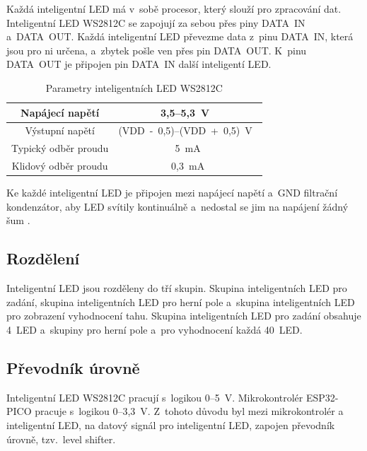   Každá inteligentní LED má v~sobě procesor, který slouží pro zpracování dat. 
  Inteligentní LED WS2812C se zapojují za sebou přes piny DATA~IN a~DATA~OUT. Každá inteligentní LED převezme data z~pinu 
  DATA~IN, která jsou pro ni určena, a~zbytek pošle ven přes pin DATA~OUT. K~pinu DATA~OUT je připojen pin DATA~IN další inteligentí LED. 

  \begin{table}[!h]
    \caption{Parametry inteligentních LED WS2812C \cite{WS2812C_datasheet}}
    \begin{center}
        \begin{tabular}{|c|c|}
            \hline
            {\cellcolor[HTML]{C0C0C0}Napájecí napětí} & 3,5--5,3~V~\\
            \hline
            {\cellcolor[HTML]{C0C0C0}Výstupní napětí} & (VDD~-~0,5)--(VDD~+~0,5)~V~\\
            \hline
            {\cellcolor[HTML]{C0C0C0}Typický odběr proudu}  & 5~mA \\
            \hline
            {\cellcolor[HTML]{C0C0C0}Klidový odběr proudu}  & 0,3~mA \\
            \hline
        \end{tabular}    
    \end{center}
  \end{table}

  Ke každé inteligentní LED je připojen mezi napájecí napětí a~GND filtrační kondenzátor, aby LED svítily kontinuálně 
  a~nedostal se jim na napájení žádný šum \cite{WS2812C_datasheet}.

  \subsection{Rozdělení}
  Inteligentní LED jsou rozděleny do tří skupin. Skupina inteligentních LED pro zadání, skupina inteligentních LED pro herní pole 
  a~skupina inteligentních LED pro zobrazení vyhodnocení tahu.
  Skupina inteligentních LED pro zadání obsahuje 4~LED a~skupiny pro herní pole a~pro vyhodnocení každá 40~LED.

  \subsection{Převodník úrovně}
  Inteligentní LED WS2812C pracují s~logikou 0--5~V. Mikrokontrolér ESP32-PICO pracuje s~logikou 0--3,3~V. 
  Z~tohoto důvodu byl mezi mikrokontrolér a inteligentní LED, na datový signál pro inteligentní LED, zapojen převodník úrovně, 
  tzv.~level shifter. 
  
